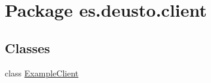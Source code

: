 \hypertarget{namespacees_1_1deusto_1_1client}{}\section{Package es.\+deusto.\+client}
\label{namespacees_1_1deusto_1_1client}
\subsection*{Classes}
\begin{DoxyCompactItemize}
\item 
class \mbox{\hyperlink{classes_1_1deusto_1_1client_1_1_example_client}{Example\+Client}}
\end{DoxyCompactItemize}

